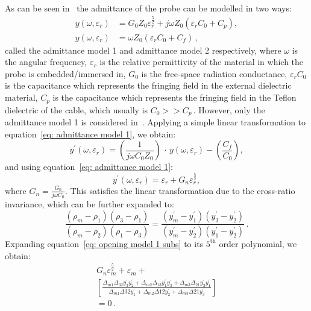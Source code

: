 \documentclass[12pt, a4paper]{article}
\begin{document}
\begin{multicols*}{2}
As can be seen in~\cite{marsland1987dielectric} the admittance of the probe can be modelled in two ways:
\begin{align}
    y(\omega, \varepsilon_r) &= G_0 Z_0 \varepsilon_r^{\frac{5}{2}} + j \omega Z_0(\varepsilon_r C_0 + C_p) ,  \label{eq: admittance model 1} \\
    y(\omega, \varepsilon_r) &= \omega Z_0(\varepsilon_r C_0 + C_f)\,, \label{eq: admittance model 2}
\end{align}
called the admittance model 1 and admittance model 2 respectively, where \(\omega\) is the angular frequency, \(\varepsilon_r\) is the relative permittivity of the material in which the probe is embedded/immersed in, \(G_0\) is the free-space radiation conductance, \(\varepsilon_r C_0\) is the capacitance which represents the fringing field in the external dielectric material, \(C_p\) is the capacitance which represents the fringing field in the Teflon dielectric of the cable, which usually is \(C_0 >> C_p\)\,. However, only the admittance model 1 is considered in~\cite{marsland1987dielectric}. Applying a simple linear transformation to equation~\ref{eq: admittance model 1}, we obtain:
\begin{equation}
    y^{\prime}(\omega, \varepsilon_r) = \left(\frac{1}{j \omega C_0 Z_0}\right)\, \cdot \,y(\omega , \varepsilon_r) - \left(\frac{C_f}{C_0}\right) , \label{eq: admittance model 1 transformed}
\end{equation}
and using equation~\ref{eq: admittance model 1}:
\begin{equation}
    y^{\prime}(\omega, \varepsilon_r) = \varepsilon_r + G_n \varepsilon_r^\frac{5}{2} , \label{eq: admittance model 1 substitution}
\end{equation}
where \(G_n = \frac{G_0}{j\omega C_0}\). This satisfies the linear transformation due to the cross-ratio invariance, which can be further expanded to:
\begin{equation}
    \frac{(\rho_m - \rho_1)(\rho_3 - \rho_1)}{(\rho_m - \rho_2)(\rho_1 - \rho_3)} = \frac{(y^{\prime}_m - y^{\prime}_1)(y^{\prime}_3 - y^{\prime}_2)}{(y^{\prime}_m - y^{\prime}_2)(y^{\prime}_1 - y^{\prime}_2)}\,. \label{eq: opening model 1 subs}
\end{equation}
Expanding equation~\ref{eq: opening model 1 subs} to its \(5^{\text{th}}\) order polynomial, we obtain:
\begin{multline}
    G_n \varepsilon_m^{\frac{5}{2}} + \varepsilon_m + \\\left[\frac{\Delta_{m1} \Delta_{32} y^{\prime}_3 y^{\prime}_2 + \Delta_{m2} \Delta_{13} y^{\prime}_1 y^{\prime}_3 + \Delta_{m3} \Delta_{21} y^{\prime}_2 y^{\prime}_1}{\Delta_{m1} \Delta{32} y^{\prime}_1 + \Delta_{m2} \Delta{12} y^{\prime}_2 + \Delta_{m3} \Delta{21} y^{\prime}_3}\right]\\ = 0\,. \label{eq: big substitution}

\end{multline}
\end{multicols*}
\end{document}
